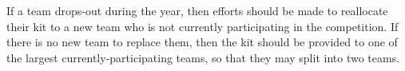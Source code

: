 If a team drops-out during the year, then efforts should be made to reallocate their kit to a new team who is not currently participating in the competition.  If there is no new team to replace them, then the kit should be provided to one of the largest currently-participating teams, so that they may split into two teams.
